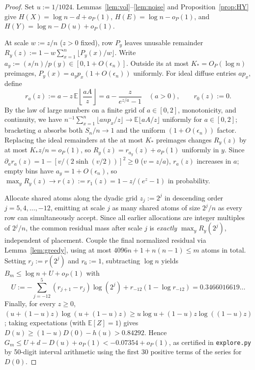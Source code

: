 \documentclass[11pt]{article}
\theoremstyle{plain}
\theoremstyle{definition}
\theoremstyle{remark}
\begin{document}
\begin{proof}
Set $u := 1/1024$. Lemmas~\ref{lem:vol}--\ref{lem:noise} and Proposition~\ref{prop:HY} give $H(X) = \log n - d + o_P(1)$, $H(E) = \log n - o_P(1)$, and $H(Y) = \log n - D(u) + o_P(1)$.

At scale $w := z/n$ ($z > 0$ fixed), row $P_y$ leaves unusable remainder $R_y(z) := 1 - w\sum_{x=1}^n \lfloor P_y(x)/w \rfloor$. Write $a_y := (s/n)/p(y) \in [0, 1 + O(\epsilon_n)]$. Outside its at most $K_* = O_P(\log n)$ preimages, $P_y(x) = a_y p_x(1 + O(\epsilon_n))$ uniformly. For ideal diffuse entries $a p_x$, define
\[
r_a(z) := a - z\,\mathbb{E}\!\left\lfloor \frac{aA}{z} \right\rfloor = a - \frac{z}{e^{z/a} - 1} \quad (a > 0),
\qquad r_0(z) := 0.
\]
By the law of large numbers on a finite grid of $a \in [0, 2]$, monotonicity, and continuity, we have $n^{-1}\sum_{x=1}^n \lfloor a n p_x / z \rfloor \to \mathbb{E}\lfloor aA/z \rfloor$ uniformly for $a \in [0, 2]$; bracketing $a$ absorbs both $S_n / n \to 1$ and the uniform $(1 + O(\epsilon_n))$ factor. Replacing the ideal remainders at the at most $K_*$ preimages changes $R_y(z)$ by at most $K_* z / n = o_P(1)$, so $R_y(z) = r_{a_y}(z) + o_P(1)$ uniformly in $y$. Since $\partial_a r_a(z) = 1 - [v/(2\sinh(v/2))]^2 \ge 0$ ($v = z/a$), $r_a(z)$ increases in $a$; empty bins have $a_y = 1 + O(\epsilon_n)$, so $\max_y R_y(z) \to r(z) := r_1(z) = 1 - z/(e^z - 1)$ in probability.

Allocate shared atoms along the dyadic grid $z_j := 2^j$ in descending order $j = 5, 4, \dots, -12$, emitting at scale $j$ as many shared atoms of size $2^j / n$ as every row can simultaneously accept. Since all earlier allocations are integer multiples of $2^j/n$, the common residual mass after scale $j$ is \emph{exactly} $\max_y R_y(2^j)$, independent of placement. Couple the final normalized residual via Lemma~\ref{lem:greedy}, using at most $4096n + 1 + n(n-1) \le m$ atoms in total. Setting $r_j := r(2^j)$ and $r_6 := 1$, subtracting $\log n$ yields $B_m \le \log n + U + o_P(1)$ with
\[
U := -\sum_{j=-12}^{5} (r_{j+1} - r_j)\log(2^j) + r_{-12}(1 - \log r_{-12}) = 0.3466016619\ldots
\]
Finally, for every $z \ge 0$, $(u + (1-u)z)\log(u + (1-u)z) \ge u\log u + (1-u)z\log((1-u)z)$; taking expectations (with $\mathbb{E}[Z] = 1$) gives $D(u) \ge (1 - u)D(0) - h(u) > 0.84292$. Hence $G_m \le U + d - D(u) + o_P(1) < -0.07354 + o_P(1)$, as certified in \texttt{explore.py} by 50-digit interval arithmetic using the first 30 positive terms of the series for $D(0)$.
\end{proof}
\end{document}
